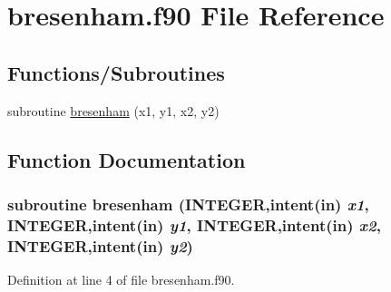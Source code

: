 \hypertarget{bresenham_8f90}{
\section{bresenham.f90 File Reference}
\label{bresenham_8f90}
}
\subsection*{Functions/Subroutines}
\begin{DoxyCompactItemize}
\item 
subroutine \hyperlink{bresenham_8f90_ab47b475845f9c900058b13a8f016ea92}{bresenham} (x1, y1, x2, y2)
\end{DoxyCompactItemize}


\subsection{Function Documentation}
\hypertarget{bresenham_8f90_ab47b475845f9c900058b13a8f016ea92}{
\subsubsection[{bresenham}]{\setlength{\rightskip}{0pt plus 5cm}subroutine bresenham (INTEGER,intent(in) {\em x1}, \/  INTEGER,intent(in) {\em y1}, \/  INTEGER,intent(in) {\em x2}, \/  INTEGER,intent(in) {\em y2})}}
\label{bresenham_8f90_ab47b475845f9c900058b13a8f016ea92}


Definition at line 4 of file bresenham.f90.